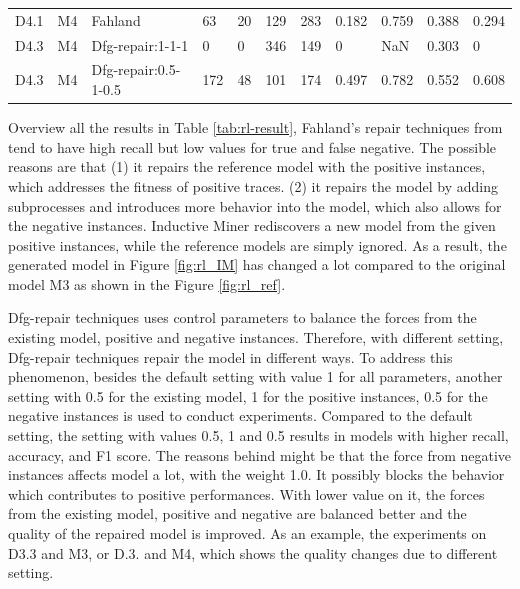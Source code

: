 \begin{table}[ht]
{\begin{tabular}{lll|llllllll|}
			\hline
			D4.1      & M4              & Fahland   & 63    &  20  & 129    &  283   & 0.182       &    0.759       &  0.388        &  0.294                 \\
			
			D4.3      & M4              & Dfg-repair:1-1-1       &   0  & 0   &  346   & 149    &   0     &    NaN       &     0.303     &  0      \\  
			D4.3      & M4              & Dfg-repair:0.5-1-0.5       &   172  & 48   &  101   & 174    &   0.497     &    0.782       &     0.552     &  0.608      \\      
			\hline              
	\end{tabular}}
\end{table}

Overview all the results in Table \ref{tab:rl-result}, Fahland's repair techniques from \cite{fahland2015model} tend to have high recall but low values for true and false negative. The possible reasons are that (1) it repairs the reference model with the positive instances, which addresses the fitness of positive traces. (2) it repairs the model by adding subprocesses and introduces more behavior into the model, which also allows for the negative instances. Inductive Miner rediscovers a new model from the given positive instances, while the reference models are simply ignored. As a result, the generated model in Figure \ref{fig:rl_IM} has changed a lot compared to the original model M3 as shown in the Figure \ref{fig:rl_ref}.  

Dfg-repair techniques uses control parameters to balance the forces from the existing model, positive and negative instances. Therefore, with different setting, Dfg-repair techniques repair the model in different ways. To address this phenomenon, besides the default setting with value 1 for all parameters, another setting with 0.5 for the existing model, 1 for the positive instances, 0.5 for the negative instances is used to conduct experiments.  Compared to the default setting, the setting with values 0.5, 1 and 0.5 results in models with higher recall, accuracy, and F1 score. The reasons behind might be that the force from negative instances affects model a lot, with the weight 1.0. It possibly blocks the behavior which contributes to positive performances.  With lower value on it, the forces from the existing model, positive and negative are balanced better and the quality of the repaired model is improved. As an example, the experiments on D3.3 and M3, or D.3. and M4, which shows the quality changes due to different setting.

